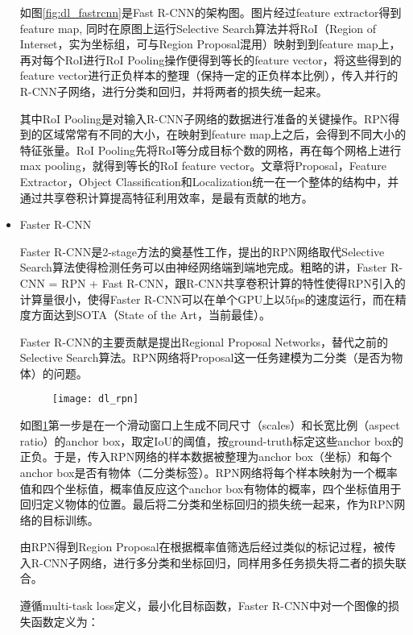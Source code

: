 \begin{itemize}
	如图\ref{fig:dl_fastrcnn}是Fast R-CNN的架构图。图片经过feature extractor得到feature map, 同时在原图上运行Selective Search算法并将RoI（Region of Interset，实为坐标组，可与Region Proposal混用）映射到到feature map上，再对每个RoI进行RoI Pooling操作便得到等长的feature vector，将这些得到的feature vector进行正负样本的整理（保持一定的正负样本比例），传入并行的R-CNN子网络，进行分类和回归，并将两者的损失统一起来。
	
其中RoI Pooling是对输入R-CNN子网络的数据进行准备的关键操作。RPN得到的区域常常有不同的大小，在映射到feature map上之后，会得到不同大小的特征张量。RoI Pooling先将RoI等分成目标个数的网格，再在每个网格上进行max pooling，就得到等长的RoI feature vector。文章将Proposal，Feature Extractor，Object Classification和Localization统一在一个整体的结构中，并通过共享卷积计算提高特征利用效率，是最有贡献的地方。
	
	\item Faster R-CNN\cite{30ren2015faster}
	
	Faster R-CNN是2-stage方法的奠基性工作，提出的RPN网络取代Selective Search算法使得检测任务可以由神经网络端到端地完成。粗略的讲，Faster R-CNN = RPN + Fast R-CNN，跟R-CNN共享卷积计算的特性使得RPN引入的计算量很小，使得Faster R-CNN可以在单个GPU上以5fps的速度运行，而在精度方面达到SOTA（State of the Art，当前最佳）。
	
Faster R-CNN的主要贡献是提出Regional Proposal Networks，替代之前的Selective Search算法。RPN网络将Proposal这一任务建模为二分类（是否为物体）的问题。

	\begin{figure}[!htbp]
    \centering
    \texttt{[image: dl\_rpn]}
    \label{fig:dl_rpn}
	\end{figure}
	如图\ref{fig:dl_rpn}第一步是在一个滑动窗口上生成不同尺寸（scales）和长宽比例（aspect ratio）的anchor box，取定IoU的阈值，按ground-truth标定这些anchor box的正负。于是，传入RPN网络的样本数据被整理为anchor box（坐标）和每个anchor box是否有物体（二分类标签）。RPN网络将每个样本映射为一个概率值和四个坐标值，概率值反应这个anchor box有物体的概率，四个坐标值用于回归定义物体的位置。最后将二分类和坐标回归的损失统一起来，作为RPN网络的目标训练。
	
由RPN得到Region Proposal在根据概率值筛选后经过类似的标记过程，被传入R-CNN子网络，进行多分类和坐标回归，同样用多任务损失将二者的损失联合。

遵循multi-task loss定义，最小化目标函数，Faster R-CNN中对一个图像的损失函数定义为：


\end{itemize}
